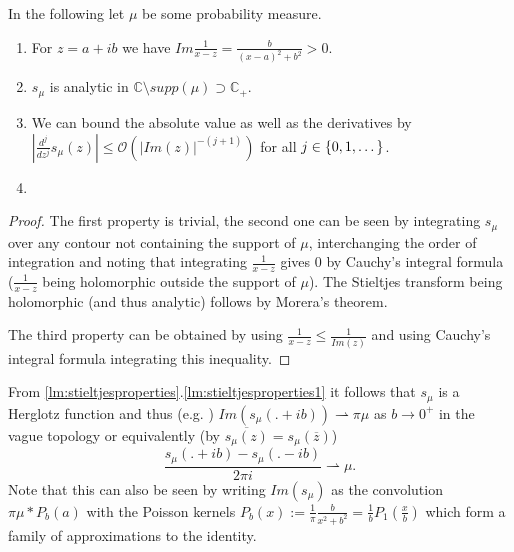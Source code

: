 \begin{lemma}\label{lm:stieltjesproperties}
In the following let $\mu$ be some probability measure.
	\begin{enumerate}
		\item For $z=a+ib$ we have $Im\frac{1}{x-z}=\frac{b}{(x-a)^2+b^2}>0$.\label{lm:stieltjesproperties1}
		\item $s_\mu$ is analytic in $\mathbb C\setminus supp(\mu)\supset\mathbb C_+$.
		\item We can bound the absolute value as well as the derivatives by $|\frac{d^j}{dz^j}s_\mu(z)|\leq \mathcal O(|Im(z)|^{-(j+1)})$ for all $j\in\mathbb \{0,1,\dots\}$.
		\item 
	\end{enumerate}
\end{lemma}

\begin{proof}
	The first property is trivial, the second one can be seen by integrating $s_\mu$ over any contour not containing the support of $\mu$, interchanging the order of integration and noting that integrating $\frac{1}{x-z}$ gives $0$ by Cauchy's integral formula ($\frac{1}{x-z}$ being holomorphic outside the support of $\mu$). The Stieltjes transform being holomorphic (and thus analytic) follows by Morera's theorem.
	
	The third property can be obtained by using $\frac{1}{x-z}\leq \frac{1}{Im(z)}$ and using Cauchy's integral formula integrating this inequality.
\end{proof}

\begin{corollary}
	From \ref{lm:stieltjesproperties}.\ref{lm:stieltjesproperties1} it follows that $s_\mu$ is a Herglotz function and thus (e.g. \cite{TeschlQM}) $Im(s_\mu(.+ib))\rightharpoonup\pi\mu$ as $b\rightarrow 0^+$ in the vague topology or equivalently (by $\overline{s_\mu(z)}=s_\mu(\overline z)$)
	\begin{equation}
		\frac{s_\mu(.+ib)-s_\mu(.-ib)}{2\pi i}\rightharpoonup\mu.
	\end{equation}
	Note that this can also be seen by writing $Im(s_\mu)$ as the convolution $\pi\mu * P_b(a)$ with the Poisson kernels $P_b(x):=\frac{1}{\pi}\frac{b}{x^2+b^2} = \frac{1}{b}P_1(\frac{x}{b})$ which form a family of approximations to the identity.
\end{corollary}

